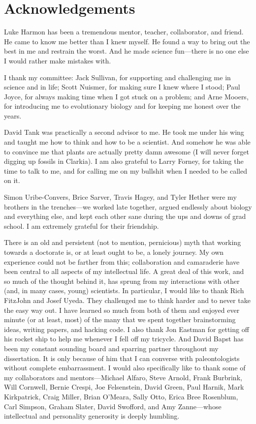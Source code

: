 \chapter*{Acknowledgements}

Luke Harmon has been a tremendous mentor, teacher, collaborator, and friend. He came to know me better than I knew myself. He found a way to bring out the best in me and restrain the worst. And he made science fun---there is no one else I would rather make mistakes with. 

I thank my committee: Jack Sullivan, for supporting and challenging me in science and in life; Scott Nuismer, for making sure I knew where I stood; Paul Joyce, for always making time when I got stuck on a problem; and Arne Mooers, for introducing me to evolutionary biology and for keeping me honest over the years.

David Tank was practically a second advisor to me. He took me under his wing and taught me how to think and how to be a scientist. And somehow he was able to convince me that plants are actually pretty damn awesome (I will never forget digging up fossils in Clarkia). I am also grateful to Larry Forney, for taking the time to talk to me, and for calling me on my bullshit when I needed to be called on it.

Simon Uribe-Convers, Brice Sarver, Travis Hagey, and Tyler Hether were my brothers in the trenches---we worked late together, argued endlessly about biology and everything else, and kept each other sane during the ups and downs of grad school. I am extremely grateful for their friendship.

There is an old and persistent (not to mention, pernicious) myth that working towards a doctorate is, or at least ought to be, a lonely journey. My own experience could not be farther from this; collaboration and camaraderie have been central to all aspects of my intellectual life. A great deal of this work, and so much of the thought behind it, has sprung from my interactions with other (and, in many cases, young) scientists. In particular, I would like to thank Rich FitzJohn and Josef Uyeda. They challenged me to think harder and to never take the easy way out. I have learned so much from both of them and enjoyed ever minute (or at least, most) of the many that we spent together brainstorming ideas, writing papers, and hacking code. I also thank Jon Eastman for getting off his rocket ship to help me whenever I fell off my tricycle. And David Bapst has been my constant sounding board and sparring partner throughout my dissertation. It is only because of him that I can converse with paleontologists without complete embarrassment. I would also specifically like to thank some of my collaborators and mentors---Michael Alfaro, Steve Arnold, Frank Burbrink, Will Cornwell, Bernie Crespi, Joe Felsenstein, David Green, Paul Harnik, Mark Kirkpatrick, Craig Miller, Brian O'Meara, Sally Otto, Erica Bree Rosenblum, Carl Simpson, Graham Slater, David Swofford, and Amy Zanne---whose intellectual and personality generosity is deeply humbling. 

